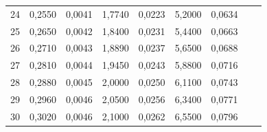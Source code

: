 \documentclass[10pt,a4paper]{article}
\begin{document}
\begin{tabular}{c|c|c|c|c|c|c|c|c}
24	&	0,2550	&	0,0041	&	1,7740	&	0,0223	&	5,2000	&	0,0634	&		&		 \\
25	&	0,2650	&	0,0042	&	1,8400	&	0,0231	&	5,4400	&	0,0663	&		&		 \\
26	&	0,2710	&	0,0043	&	1,8890	&	0,0237	&	5,6500	&	0,0688	&		&		 \\
27	&	0,2810	&	0,0044	&	1,9450	&	0,0243	&	5,8800	&	0,0716	&		&		 \\
28	&	0,2880	&	0,0045	&	2,0000	&	0,0250	&	6,1100	&	0,0743	&		&		 \\
29	&	0,2960	&	0,0046	&	2,0500	&	0,0256	&	6,3400	&	0,0771	&		&		 \\
30	&	0,3020	&	0,0046	&	2,1000	&	0,0262	&	6,5500	&	0,0796	&		&		 \\

\end{tabular}
\end{document}
